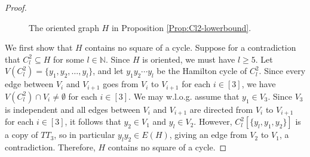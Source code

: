 \documentclass[11pt,a4paper,reqno]{amsart}
\theoremstyle{definition} %
\begin{document}
\begin{proof}
   
\begin{figure}[!ht]
        \centering
    \caption{The oriented graph $H$ in Proposition \ref{Prop:Cl2-lowerbound}.}\label{FIG-38}
    \end{figure}


    We first show that $H$ contains no square of a cycle. Suppose for a contradiction that $C_l^2\subseteq H$ for some $l\in\mathbb{N}$. Since $H$ is oriented, we must have $l\geqslant 5$. Let $V(C_l^2)=\{y_1,y_2,\ldots,y_l\}$, and let $y_1y_2\cdots y_l$ be the Hamilton cycle of $C_l^2$. Since every edge between $V_i$ and $V_{i+1}$ goes from $V_i$ to $V_{i+1}$ for each $i\in[3]$, we have $V(C_l^2)\cap V_i\neq\emptyset$ for each $i\in[3]$. We may w.l.o.g.  assume that $y_1\in V_3$.  Since $V_3$ is independent and all edges between $V_i$ and $V_{i+1}$ are directed from $V_i$ to $V_{i+1}$ for each $i\in[3]$, it follows that $y_2\in V_1$ and $y_l\in V_2$. However, $C_l^2[\{y_l,y_1,y_2\}]$ is a copy of $TT_3$, so in particular $y_ly_2\in E(H)$, giving an edge from $V_2$ to $V_1$, a contradiction. Therefore, $H$ contains no square of a cycle.


\end{proof}
\end{document}
